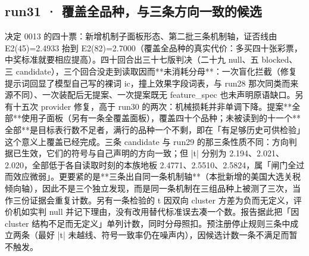 \documentclass[11pt]{ctexart}
\begin{document}
\clearpage
\subsection{run31 · 覆盖全品种，与三条方向一致的候选}
决定 0013 的四十票：新增机制子面板形态、第二批三条机制轴，证否线由 E2(45)=2.4933 抬到 E2(82)=2.7000（覆盖全品种的真实代价：多买四十张彩票，中奖标准就要相应提高）。四十回合出三十七版判决（二十九 null、五 blocked、三 candidate），三个回合没走到读取因而**未消耗分母**：一次盲化拦截（修复提示词回显了模型自己写的裸词 ic，撞上效果字段词表，与 run28 那次同类而来源不同）、一次装配后无提案、一次提案既无 feature\_spec 也未声明原语缺口。另有十五次 provider 修复，高于 run30 的两次：机械损耗并非单调下降。提案**全部**使用子面板（另有一条全覆盖面板），覆盖四十个品种；未被读到的十一个**全部**是目标表行数不足者，满行的品种一个不剩，即在「有足够历史可供检验」这个意义上覆盖已经完成。三条 candidate 与 run29 的那三条性质不同：方向判据已生效，它们的符号与自己声明的方向一致；但 |t| 分别为 2.194、2.021、2.020，全部低于各自读取时刻的本族地板 2.4771、2.5510、2.5824，属「闸门全过而效应微弱」。更要紧的是**三条出自同一条机制轴**（本批新增的美国大选关税倾向轴），因此不是三个独立发现，而是同一条机制在三组品种上被测了三次，当作三份证据会重复计数。另有一条检验的 t 因双向 cluster 方差为负而无定义，评价机如实判 null 并记下理由，没有改用替代标准误去凑一个数。报告据此把「因 cluster 结构不足而无定义」单列计数，同时分母照扣。预注册停止规则三条中成立两条（最好 |t| 未越线、符号一致率仍在噪声内），因候选计数一条不满足而暂不触发。
\end{document}
